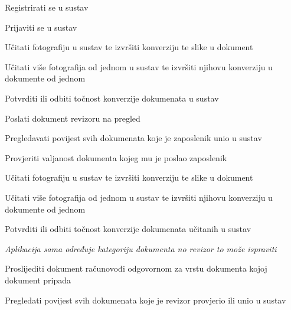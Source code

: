 			
			\begin{packed_enum}
				
				\item  {}
				\begin{packed_enum}
					
					\item Registrirati se u sustav
					
				\end{packed_enum}
			
				\item  {}
				
				\begin{packed_enum}
					
					\item Prijaviti se u sustav
					\item Učitati fotografiju u sustav te izvršiti konverziju te slike u dokument
					\item Učitati više fotografija od jednom u sustav te izvršiti njihovu konverziju u dokumente od jednom	
					\item Potvrditi ili odbiti točnost konverzije dokumenata u sustav
					\item Poslati dokument revizoru na pregled
					\item Pregledavati povijest svih dokumenata koje je zaposlenik unio u sustav
					
				\end{packed_enum}
			
				\item  {}
				
				\begin{packed_enum}

					\item Provjeriti valjanost dokumenta kojeg mu je poslao zaposlenik
					\item Učitati fotografiju u sustav te izvršiti konverziju te slike u dokument 
					\item Učitati više fotografija od jednom u sustav te izvršiti njihovu konverziju u dokumente od jednom
					\item Potvrditi ili odbiti točnost konverzije dokumenata učitanih u sustav
					\item \textit{Aplikacija sama određuje kategoriju dokumenta no revizor to može ispraviti}
					\item Proslijediti dokument računovođi odgovornom za vrstu dokumenta kojoj dokument pripada
					\item Pregledati povijest svih dokumenata koje je revizor provjerio ili unio u sustav
					

\end{packed_enum}
\end{packed_enum}
